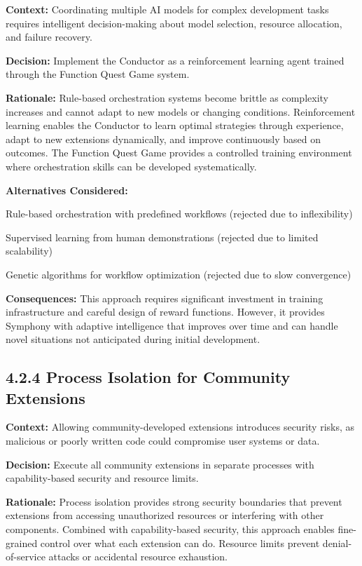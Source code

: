 \textbf{Context:} Coordinating multiple AI models for complex development tasks requires intelligent decision-making about model selection, resource allocation, and failure recovery.

\textbf{Decision:} Implement the Conductor as a reinforcement learning agent trained through the Function Quest Game system.

\textbf{Rationale:} Rule-based orchestration systems become brittle as complexity increases and cannot adapt to new models or changing conditions. Reinforcement learning enables the Conductor to learn optimal strategies through experience, adapt to new extensions dynamically, and improve continuously based on outcomes. The Function Quest Game provides a controlled training environment where orchestration skills can be developed systematically.

\textbf{Alternatives Considered:}
\begin{compactlist}
    \item Rule-based orchestration with predefined workflows (rejected due to inflexibility)
    \item Supervised learning from human demonstrations (rejected due to limited scalability)
    \item Genetic algorithms for workflow optimization (rejected due to slow convergence)
\end{compactlist}

\textbf{Consequences:} This approach requires significant investment in training infrastructure and careful design of reward functions. However, it provides Symphony with adaptive intelligence that improves over time and can handle novel situations not anticipated during initial development.

\subsection*{4.2.4 Process Isolation for Community Extensions}

\textbf{Context:} Allowing community-developed extensions introduces security risks, as malicious or poorly written code could compromise user systems or data.

\textbf{Decision:} Execute all community extensions in separate processes with capability-based security and resource limits.

\textbf{Rationale:} Process isolation provides strong security boundaries that prevent extensions from accessing unauthorized resources or interfering with other components. Combined with capability-based security, this approach enables fine-grained control over what each extension can do. Resource limits prevent denial-of-service attacks or accidental resource exhaustion.

